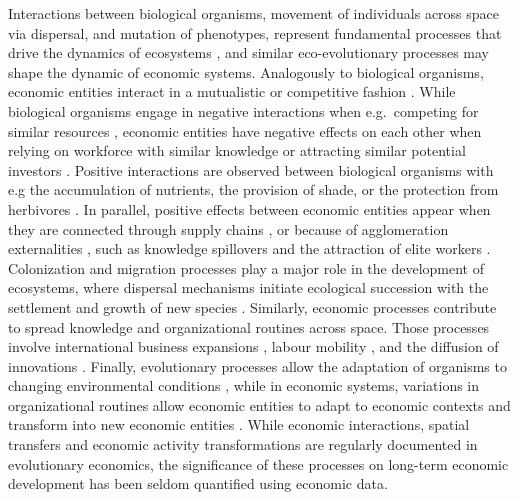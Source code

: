   Interactions between biological organisms, movement of individuals across space via dispersal, and mutation of phenotypes, represent fundamental processes that drive the dynamics of ecosystems \citep{Vellend2010}, and similar eco-evolutionary processes may shape the dynamic of economic systems.
  Analogously to biological organisms, economic entities interact in a mutualistic or competitive fashion \citep{Pistorius1997}. While biological organisms engage in negative interactions when e.g.~competing for similar resources \citep{GRIME1973}, economic entities have negative effects on each other when relying on workforce with similar knowledge or attracting similar potential investors \citep{Wernerfelt1989}.
  Positive interactions are observed between biological organisms with e.g the accumulation of nutrients, the provision of shade, or the protection from herbivores \citep{Wernerfelt1989,Callaway2002}. In parallel, positive effects between economic entities appear when they are connected through supply chains \citep{Ozman2009,Saavedra2009a}, or because of agglomeration externalities \cite{VanDerPanne2004}, such as knowledge spillovers \citep{Menon2015} and the attraction of elite workers \citep{Cohendet2018}.
  Colonization and migration processes play a major role in the development of ecosystems, where dispersal mechanisms initiate ecological succession with the settlement and growth of new species \citep{Leibold2004}. Similarly, economic processes contribute to spread knowledge and organizational routines across space. Those processes involve international business expansions \citep{Zahra2000,Zahra2000}, labour mobility \citep{Boschma2008}, and the diffusion of innovations \citep{RogersEverettM2003DoI}.
  Finally, evolutionary processes allow the adaptation of organisms to changing environmental conditions \citep{Bell2017}, while in economic systems, variations in organizational routines allow economic entities to adapt to economic contexts \citep{Cordes2006} and transform into new economic entities \citep{Freeman2002,Hodgson2004,Aldrich2008}. %
  While economic interactions, spatial transfers and economic activity transformations are regularly documented in evolutionary economics, the significance of these processes on long-term economic development has been seldom quantified using economic data.%

